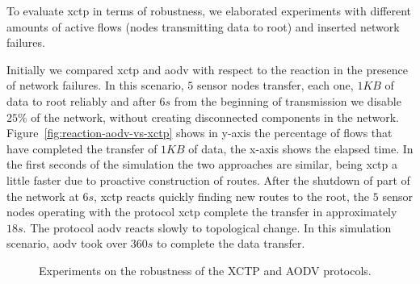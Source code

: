 To evaluate \ac{xctp} in terms of robustness, we elaborated experiments with
different amounts of active flows (nodes transmitting data to root)
and inserted network failures.

Initially we compared \ac{xctp} and \ac{aodv} with respect to the reaction in
the presence of network failures. In this scenario, $5$ sensor nodes transfer,
each one, $1KB$ of data to root reliably and after $6s$ from the beginning of
transmission we disable $25\%$ of the network, without creating disconnected
components in the network. Figure~\ref{fig:reaction-aodv-vs-xctp} shows in
y-axis the percentage of flows that have completed the transfer of $1KB$ of
data, the x-axis shows the elapsed time. In the first seconds of the simulation
the two approaches are similar, being \ac{xctp} a little faster due to
proactive construction of routes. After the shutdown of part of the network at
$6s$, \ac{xctp} reacts quickly finding new routes to the root, the $5$ sensor
nodes operating with the protocol \ac{xctp} complete the transfer in
approximately $18s$. The protocol \ac{aodv} reacts slowly to topological
change. In this simulation scenario, \ac{aodv} took over $360s$ to complete the
data transfer.

\begin{figure}[!ht]
\centerline{
} \caption{Experiments on the robustness of the XCTP and AODV
protocols.} \label{fig:robustez}
\end{figure}





